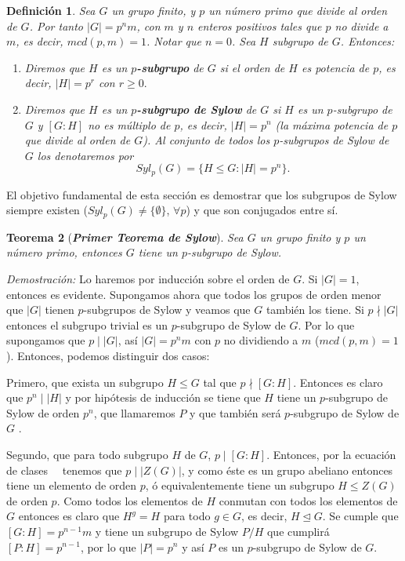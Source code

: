 \documentclass[12pt]{article}
\newtheorem{theorem}{Teorema}[section]
\newtheorem{definition}[theorem]{Definición}
\begin{document}
\begin{definition} Sea $G$ un grupo finito, y $p$ un número primo que divide al orden de $G$. Por tanto $|G| = p^{n}m$, con $m$ y $n$ enteros positivos tales que $p$ no divide a $m$, es decir, $mcd(p,m)=1$. Notar que $n=0$. Sea $H$ subgrupo de $G$. Entonces:
\begin{enumerate}
\item Diremos que $H$ es un \textbf{$p$-subgrupo} de $G$ si el orden de $H$ es potencia de $p$, es decir, $|H| = p^{r}$ con $r \geq 0.$
\item Diremos que $H$ es un \textbf{$p$-subgrupo de Sylow} de $G$ si $H$ es un $p$-subgrupo de $G$ y $\left[ G:H \right]$ no es múltiplo de $p$, es decir, $|H| = p^{n}$ (la máxima potencia de $p$ que divide al orden de $G$). Al conjunto de todos los $p$-subgrupos de Sylow de $G$ los denotaremos por $$Syl_{p}(G) = \lbrace H \leq G : |H| = p^{n} \rbrace.$$
\end{enumerate}
\end{definition}

El objetivo fundamental de esta sección es demostrar que los subgrupos de Sylow siempre existen ($Syl_{p}(G) \neq \lbrace \emptyset \rbrace$, $\forall p$) y que son conjugados entre sí. 

\begin{theorem}[\textit{\textbf{Primer Teorema de Sylow}}]
Sea $G$ un grupo finito y $p$ un número primo, entonces $G$ tiene un $p$-subgrupo de Sylow.
\end{theorem}
\emph{Demostración: }Lo haremos por inducción sobre el orden de $G$. Si $|G| = 1$, entonces es evidente. Supongamos ahora que todos los grupos de orden menor que $|G|$ tienen $p$-subgrupos de Sylow y veamos que $G$ también los tiene.
Si $p \nmid |G|$ entonces el subgrupo trivial es un $p$-subgrupo de Sylow de $G$. Por lo que supongamos que $p \mid |G|$, así $|G| = p^{n}m$ con $p$ no dividiendo a $m$ ($mcd(p,m)=1$). Entonces, podemos distinguir dos casos: 

Primero, que exista un subgrupo $H \leq G$ tal que $p \nmid [G:H]$. Entonces es claro que $p^{n} \mid |H|$ y por hipótesis de inducción se tiene que $H$ tiene un $p$-subgrupo de Sylow de orden $p^{n}$, que llamaremos $P$ y que también será $p$-subgrupo de Sylow de $G$ .

Segundo, que para todo subgrupo $H$ de $G$, $p \mid [G:H]$. Entonces, por la ecuación de clases~~ tenemos que $p \mid |Z(G)|$, y como éste es un grupo abeliano entonces tiene un elemento de orden $p$, ó equivalentemente tiene un subgrupo $H \leq Z(G)$ de orden $p$. Como todos los elementos de $H$ conmutan con todos los elementos de $G$ entonces es claro que $H^{g} = H$ para todo $g \in G$, es decir, $H \unlhd G$. Se cumple que $[G:H] = p^{n-1}m$ y tiene un subgrupo de Sylow $P/H$ que cumplirá $[P:H] = p^{n-1}$, por lo que $|P| = p^{n}$ y así $P$ es un $p$-subgrupo de Sylow de $G$.
\end{document}
